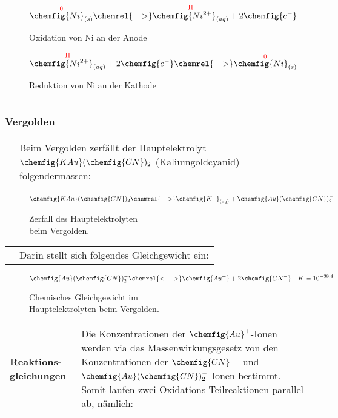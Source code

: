 \begin{figure}[H]\centering
	$$\overset{\mathrm{\color{red}{0}}}{\chemfig{Ni}_{(s)}} \chemrel{->} \overset{\mathrm{\color{red}{II}}}{\chemfig{Ni^{2+}}_{(aq)}} + 2\chemfig{e^{-}}$$
	\caption{Oxidation von Ni an der Anode}
	$$\overset{\mathrm{\color{red}{II}}}{\chemfig{Ni^{2+}}_{(aq)}} + 2\chemfig{e^{-}} \chemrel{->} \overset{\mathrm{\color{red}{0}}}{\chemfig{Ni}_{(s)}}$$
	\caption{Reduktion von Ni an der Kathode}
\end{figure}

\begin{longtable}{p{3cm}p{14cm}}
    & \\
    \hline
\end{longtable}

\subsubsection{Vergolden}
\begin{longtable}{p{3cm}p{14cm}}
    & Beim Vergolden zerfällt der Hauptelektrolyt $\chemfig{KAu}(\chemfig{CN})_{2}$ (Kaliumgoldcyanid) folgendermassen:
\end{longtable}

\begin{figure}[H]\centering
    $$\chemfig{KAu}(\chemfig{CN})_{2} \chemrel{->} \chemfig{K^{+}}_{(aq)} + \chemfig{Au}(\chemfig{CN})^{-}_2$$
    \caption{Zerfall des Hauptelektrolyten\\ beim Vergolden.}
\end{figure}

\begin{longtable}{p{3cm}p{14cm}}
    & Darin stellt sich folgendes Gleichgewicht ein:
\end{longtable}

\begin{figure}[H]\centering
    $$\chemfig{Au}(\chemfig{CN})^{-}_2 \chemrel{<->} \chemfig{Au^{+}} + 2\chemfig{CN^{-}} \quad K = 10^{-38.4}$$
    \caption{Chemisches Gleichgewicht im\\ Hauptelektrolyten beim Vergolden.}
\end{figure}

\begin{longtable}{p{3cm}p{14cm}}
    \hline
    \textbf{Reaktions-gleichungen}
    & Die Konzentrationen der $\chemfig{Au}^{+}$-Ionen werden via das Massenwirkungsgesetz von den Konzentrationen
    der $\chemfig{CN}^{-}$- und $\chemfig{Au}(\chemfig{CN})_2^{-}$-Ionen bestimmt. Somit laufen zwei Oxidations-Teilreaktionen parallel ab, nämlich:\\
\end{longtable}

